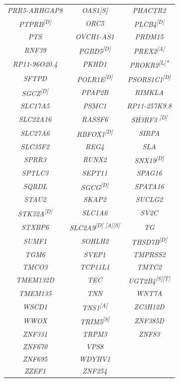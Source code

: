 \begin{refsection}
\begin{otherlanguage}{english}
\begin{scriptsize}
\begin{longtable}{ccc}
\textit{PRR5-ARHGAP8} & \textit{OAS1{[}S{]}} & \textit{PHACTR2} \\
\textit{PTPRB\textsuperscript{{[}D{]}}} & \textit{ORC5} & \textit{PLCB4\textsuperscript{{[}D{]}}} \\
\textit{PTS} & \textit{OVCH1-AS1} & \textit{PRDM15} \\
\textit{RNF39} & \textit{PGBD5\textsuperscript{{[}D{]}}} & \textit{PREX2\textsuperscript{{[}A{]}}} \\
\textit{RP11-96O20.4} & \textit{PKHD1} & \textit{PROKR2\textsuperscript{{[}L{]}*}} \\
\textit{SFTPD} & \textit{POLR1E\textsuperscript{{[}D{]}}} & \textit{PSORS1C1\textsuperscript{{[}D{]}}} \\
\textit{SGCZ\textsuperscript{{[}D{]}}} & \textit{PPAP2B} & \textit{RIMKLA} \\
\textit{SLC17A5} & \textit{PSMC1} & \textit{RP11-257K9.8} \\
\textit{SLC22A16} & \textit{RASSF6} & \textit{SH3RF3		\textsuperscript{{[}D{]}}} \\
\textit{SLC27A6} & \textit{RBFOX1\textsuperscript{{[}D{]}}} & \textit{SIRPA} \\
\textit{SLC35F2} & \textit{REG4} & \textit{SLA} \\
\textit{SPRR3} & \textit{RUNX2} & \textit{SNX19\textsuperscript{{[}D{]}}} \\
\textit{SPTLC3} & \textit{SEPT11} & \textit{SPAG16} \\
\textit{SQRDL} & \textit{SGCG\textsuperscript{{[}D{]}}} & \textit{SPATA16} \\
\textit{STAU2} & \textit{SKAP2} & \textit{SUCLG2} \\
\textit{STK32A\textsuperscript{{[}D{]}}} & \textit{SLC1A6} & \textit{SV2C} \\
\textit{STXBP6} & \textit{SLC2A9\textsuperscript{{[}D{]} {[}A{]}{[}S{]}}} & \textit{TG} \\
\textit{SUMF1} & \textit{SOHLH2} & \textit{THSD7B\textsuperscript{{[}D{]}}} \\
\textit{TGM6} & \textit{SVEP1} & \textit{TMPRSS2} \\
\textit{TMCO3} & \textit{TCP11L1} & \textit{TMTC2} \\
\textit{TMEM132D} & \textit{TEC} & \textit{UGT2B4\textsuperscript{{[}S{]}{[}T{]}}} \\
\textit{TMEM135} & \textit{TNN} & \textit{WNT7A} \\
\textit{WSCD1} & \textit{TNS1\textsuperscript{{[}A{]}}} & \textit{ZC3H12D} \\
\textit{WWOX} & \textit{TRIM5\textsuperscript{{[}S{]}}} & \textit{ZNF385D} \\
\textit{ZNF331} & \textit{TRPM3} & \textit{ZNF83} \\
\textit{ZNF670} & \textit{VPS8} &  \\
\textit{ZNF695} & \textit{WDYHV1} &  \\
\textit{ZZEF1} & \textit{ZNF254} &  \\ \bottomrule
\end{longtable}
\end{scriptsize}



\end{otherlanguage}
\end{refsection}
